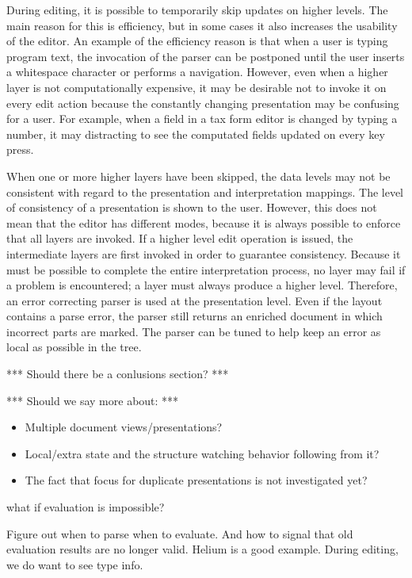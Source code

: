 During editing, it is possible to temporarily skip updates on higher levels. The main reason for this is efficiency, but in some cases it also increases the usability of the editor. An example of the efficiency reason is that when a user is typing program text, the invocation of the parser can be postponed until the user inserts a whitespace character or performs a navigation. However, even when a higher layer is not computationally expensive, it may be desirable not to invoke it on every edit action because the constantly changing presentation may be confusing for a user. For example, when a field in a tax form editor is changed by typing a number, it may distracting to see the computated fields updated on every key press.

When one or more higher layers have been skipped, the data levels may not be consistent with regard to the presentation and interpretation mappings. The level of consistency of a presentation is shown to the user. However, this does not mean that the editor has different modes, because it is always possible to enforce that all layers are invoked. If a higher level edit operation is issued, the intermediate layers are first invoked in order to guarantee consistency. Because it must be possible to complete the entire interpretation process, no layer may fail if a problem is encountered; a layer must always produce a higher level. Therefore, an error correcting parser is used at the presentation level. Even if the layout contains a parse error, the parser still returns an enriched document in which incorrect parts are marked. The parser can be tuned to help keep an error as local as possible in the tree.

 

*** Should there be a conlusions section? ***

*** Should we say more about: ***
\begin{itemize}
\item Multiple document views/presentations?
\item Local/extra state and the structure watching behavior following from it?
\item The fact that focus for duplicate presentations is not investigated yet?
\end{itemize}


\bc
what if evaluation is impossible?

Figure out when to parse when to evaluate. And how to signal that old evaluation results are no longer valid. Helium is a good example. During editing, we do want to see type info.

